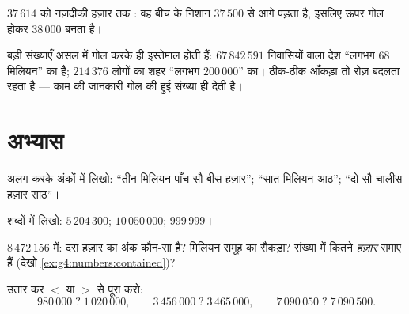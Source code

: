 \begin{omfigure}

{\small $37\,614$ को नज़दीकी हज़ार तक : वह बीच के निशान
$37\,500$ से आगे पड़ता है, इसलिए ऊपर गोल होकर $38\,000$ बनता है।}
\end{omfigure}

\begin{example}[दुनिया में परिमाण की कोटि]\label{ex:g4:numbers:world}
बड़ी संख्याएँ असल में गोल करके ही इस्तेमाल होती हैं:
$67\,842\,591$ निवासियों वाला देश ``लगभग $68$ मिलियन'' का है;
$214\,376$ लोगों का शहर ``लगभग $200\,000$'' का। ठीक-ठीक आँकड़ा
तो रोज़ बदलता रहता है --- काम की जानकारी गोल की हुई संख्या ही
देती है।
\end{example}

\section{अभ्यास}

\begin{exercise}[$\star$]\label{exo:g4:numbers:1}
 अलग करके अंकों में लिखो: ``तीन मिलियन पाँच सौ बीस
हज़ार''; ``सात मिलियन आठ''; ``दो सौ चालीस हज़ार
साठ''।
\end{exercise}

\begin{exercise}[$\star$]\label{exo:g4:numbers:2}
शब्दों में लिखो: $5\,204\,300$; \quad $10\,050\,000$; \quad
$999\,999$।
\end{exercise}

\begin{exercise}[$\star$]\label{exo:g4:numbers:3}
$8\,472\,156$ में: दस हज़ार का अंक कौन-सा है? मिलियन समूह का
सैकड़ा? संख्या में कितने \emph{हज़ार} समाए हैं
(देखो \cref{ex:g4:numbers:contained})?
\end{exercise}

\begin{exercise}[$\star$]\label{exo:g4:numbers:4}
उतार कर $<$ या $>$ से पूरा करो:
\[
980\,000 \;?\; 1\,020\,000, \qquad
3\,456\,000 \;?\; 3\,465\,000, \qquad
7\,090\,050 \;?\; 7\,090\,500 .
\]
\end{exercise}

